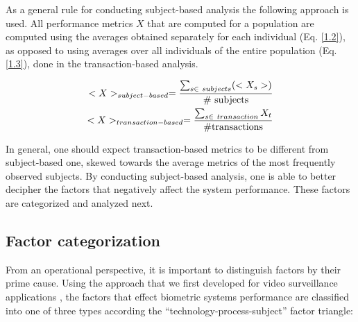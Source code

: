 \documentclass{cta-author}%
\begin{document}
As a general rule for conducting subject-based analysis the following approach is used.  All performance metrics $X$ that are computed for a population
are computed using the averages obtained separately for each individual (Eq. \ref{1.2}), as opposed to  
 using averages over all individuals of the entire population (Eq. \ref{1.3}), done in the transaction-based analysis.


\begin{eqnarray}
<X>_{subject-based} = { \sum_{s\in \ subjects} ( <X_s> ) \over {\rm \#\ subjects} }  \label{1.2} \\
<X>_{transaction-based} = { \sum_{s\in \ transaction}  X_t   \over {\rm \# transactions} } \label{1.3} 
\end{eqnarray}

In general, one should expect transaction-based metrics to be different from subject-based one, skewed towards  the average metrics of the most frequently observed subjects.
By conducting subject-based analysis, one  is able to better decipher the factors that negatively affect the system performance.
These factors are categorized and analyzed next.



\subsection{Factor categorization}
\label{s.Factors}

From an operational perspective, it is important to distinguish factors by their prime cause.
Using the approach that we first developed for video surveillance applications 
\cite{GorodnichyVA}, 
the factors that effect biometric systems performance are classified into one of three types according the ``technology-process-subject'' factor triangle: 
\end{document}
